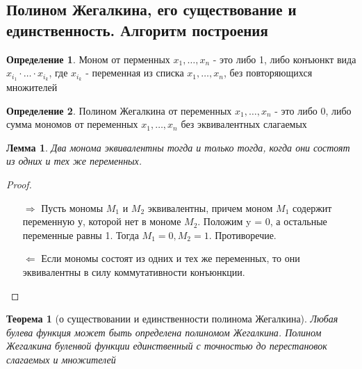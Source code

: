 \documentclass[a4paper]{article}
\newtheorem{theorem}{Теорема}[section]
\newtheorem{lemma}{Лемма}[section]
\theoremstyle{definition}
\newtheorem*{definition}{Определение}
\theoremstyle{remark}
\begin{document}
    \subsection{Полином Жегалкина, его существование и единственность. Алгоритм построения}
	\begin{definition}
		Моном от перменных $x_1, \dots , x_n$ - это либо 1, либо конъюнкт вида $x_{i_1} \cdot \dots  \cdot x_{i_k}$, где $x_{i_k}$ - переменная из списка $x_1, \dots , x_n$, без повторяющихся множителей
	\end{definition}
	\begin{definition}
		Полином Жегалкина от переменных $x_1, \dots , x_n$ - это либо 0, либо сумма мономов от переменных $x_1, \dots , x_n$ без эквивалентных слагаемых
	\end{definition}
    \begin{lemma}
        Два монома эквивалентны тогда и только тогда, когда они состоят из одних и тех же переменных.
    \end{lemma}
    \begin{proof}
        $ $\\
        \begin{itemize}
            \item[$\Rightarrow$] Пусть мономы $M_1$ и $M_2$ эквивалентны, причем моном $M_1$ содержит переменную у,
            которой нет в мономе $M_2$. Положим y = 0, а остальные переменные равны 1. Тогда $M_1 = 0, M_2 = 1$.
            Противоречие.
            \item[$\Leftarrow$] Если мономы состоят из одних и тех же переменных, то они эквивалентны в силу коммутативности конъюнкции.
        \end{itemize}
    \end{proof}
	\begin{theorem}[о существовании и единственности полинома Жегалкина]
		Любая булева функция может быть определена полиномом Жегалкина. Полином Жегалкина буленвой функции единственный с точностью до перестановок слагаемых и множителей
	\end{theorem}
\end{document}
